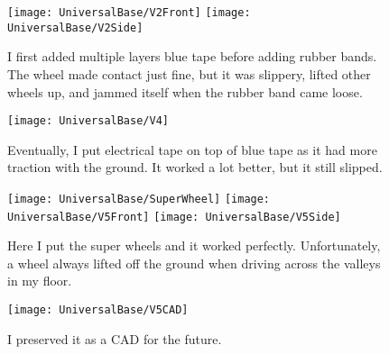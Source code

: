 \begin{figure}[h]
    \centering
    \texttt{[image: UniversalBase/V2Front]}
    \texttt{[image: UniversalBase/V2Side]}
    \caption{
        I first added multiple layers blue tape before adding rubber bands. The wheel made contact just fine, but it was slippery, lifted other wheels up, and jammed itself when the rubber band came loose.
    }
\end{figure}

\begin{figure}[h]
    \centering
    \texttt{[image: UniversalBase/V4]}
    \caption{
        Eventually, I put electrical tape on top of blue tape as it had more traction with the ground. It worked a lot better, but it still slipped.
    }
\end{figure}

\begin{figure}[h]
    \centering
    \texttt{[image: UniversalBase/SuperWheel]}
    \texttt{[image: UniversalBase/V5Front]}
    \texttt{[image: UniversalBase/V5Side]}
    \caption{
        Here I put the super wheels and it worked perfectly. Unfortunately, a wheel always lifted off the ground when driving across the valleys in my floor.
    }
\end{figure}


\begin{figure}[h]
    \centering
    \texttt{[image: UniversalBase/V5CAD]}
    \caption{
        I preserved it as a CAD for the future.
    }
\end{figure}
